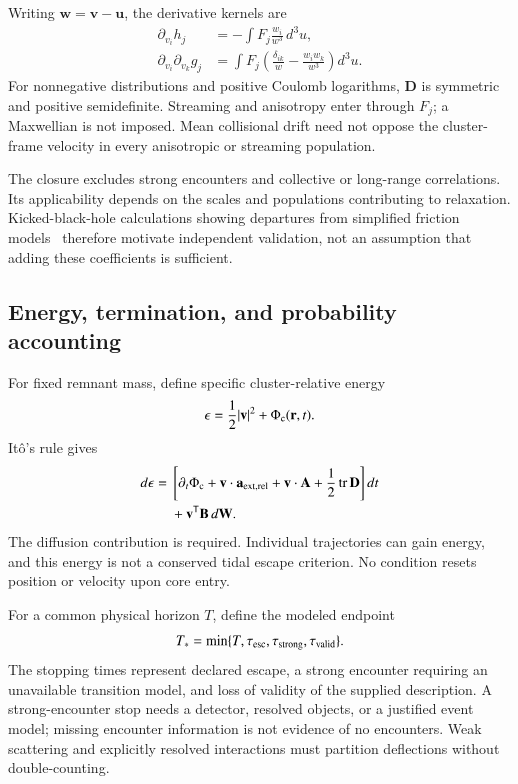 \documentclass[aps,prd,reprint,amsmath,amssymb,superscriptaddress,nofootinbib,longbibliography,floatfix]{revtex4-2}
\begin{document}
Writing $\mathbf w=\mathbf v-\mathbf u$, the derivative kernels are
\begin{align}
\partial_{v_i}h_j
&=-\int F_j\frac{w_i}{w^3}\,d^3u,\label{eq:h-kernel}\\
\partial_{v_i}\partial_{v_k}g_j
&=\int F_j\left(\frac{\delta_{ik}}{w}
-\frac{w_iw_k}{w^3}\right)d^3u.
\label{eq:g-kernel}
\end{align}
For nonnegative distributions and positive Coulomb logarithms, $\mathbf D$ is symmetric and positive semidefinite. Streaming and anisotropy enter through $F_j$; a Maxwellian is not imposed. Mean collisional drift need not oppose the cluster-frame velocity in every anisotropic or streaming population.

The closure excludes strong encounters and collective or long-range correlations. Its applicability depends on the scales and populations contributing to relaxation. Kicked-black-hole calculations showing departures from simplified friction models~\cite{Webb2018} therefore motivate independent validation, not an assumption that adding these coefficients is sufficient.

\subsection{Energy, termination, and probability accounting}

For fixed remnant mass, define specific cluster-relative energy
\begin{equation}
\epsilon=\frac12|\mathbf v|^2+\Phi_{\rm c}(\mathbf r,t).
\label{eq:energy}
\end{equation}
It\^o's rule gives
\begin{align}
d\epsilon={}&\left[
\partial_t\Phi_{\rm c}
+\mathbf v\cdot\mathbf a_{\rm ext,rel}
+\mathbf v\cdot\mathbf A
+\frac12\operatorname{tr}\mathbf D
\right]dt\nonumber\\
&+\mathbf v^{\mathsf T}\mathbf B\,d\mathbf W.
\label{eq:energy-balance}
\end{align}
The diffusion contribution is required. Individual trajectories can gain energy, and this energy is not a conserved tidal escape criterion. No condition resets position or velocity upon core entry.

For a common physical horizon $T$, define the modeled endpoint
\begin{equation}
T_*=\min\{T,\tau_{\rm esc},\tau_{\rm strong},\tau_{\rm valid}\}.
\label{eq:stopping}
\end{equation}
The stopping times represent declared escape, a strong encounter requiring an unavailable transition model, and loss of validity of the supplied description. A strong-encounter stop needs a detector, resolved objects, or a justified event model; missing encounter information is not evidence of no encounters. Weak scattering and explicitly resolved interactions must partition deflections without double-counting.
\end{document}
